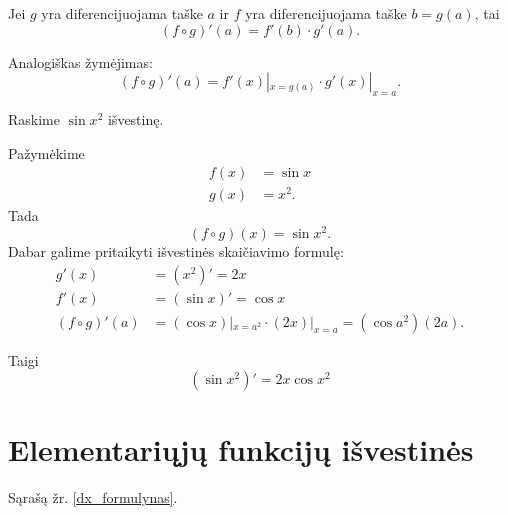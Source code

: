 \begin{prop}
  Jei $g$ yra diferencijuojama taške $a$ ir $f$ yra diferencijuojama 
  taške $b = g(a)$, tai
  \begin{equation*}
    (f \circ g)'(a) = f'(b) \cdot g'(a).
  \end{equation*}

  Analogiškas žymėjimas:
  \begin{equation*}
    (f \circ g)'(a) = f'(x)|_{x = g(a)} \cdot g'(x)|_{x = a}.
  \end{equation*}
\end{prop}

\begin{exmp}
  Raskime $\sin x^{2}$ išvestinę.

  Pažymėkime
  \begin{align*}
    f(x) &= \sin x \\
    g(x) &= x^{2}.
  \end{align*}
  Tada 
  \begin{equation*}
    (f \circ g)(x) = \sin x^{2}.
  \end{equation*}
  Dabar galime pritaikyti išvestinės skaičiavimo formulę:
  \begin{align*}
    g'(x) &= (x^{2})' = 2x \\
    f'(x) &= (\sin x)' = \cos x \\
    (f \circ g)'(a) &= (\cos x)|_{x = a^{2}} \cdot (2x)|_{x=a} 
      = (\cos a^2)(2a).
  \end{align*}

  Taigi
  \begin{equation*}
    (\sin x^{2})' = 2x \cos x^{2}
  \end{equation*}

\end{exmp}

\section{Elementariųjų funkcijų išvestinės}

Sąrašą žr. \ref{dx_formulynas}.
